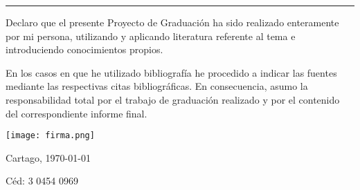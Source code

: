 \thispagestyle{empty}

\rule{10mm}{0pt}

\vfill

Declaro que el presente Proyecto de Graduación ha sido realizado enteramente
por mi persona, utilizando y aplicando literatura referente al tema e
introduciendo conocimientos propios.

En los casos en que he utilizado bibliografía he procedido a indicar las
fuentes mediante las respectivas citas bibliográficas.  En consecuencia,
asumo la responsabilidad total por el trabajo de graduación realizado y por
el contenido del correspondiente informe final.



\vspace*{8mm}

\begin{flushright}
 \texttt{[image: firma.png]}\\
  \scriptAuthor\par
  Cartago, \today\par
  Céd: 3 0454 0969
\end{flushright}

\cleardoublepage

